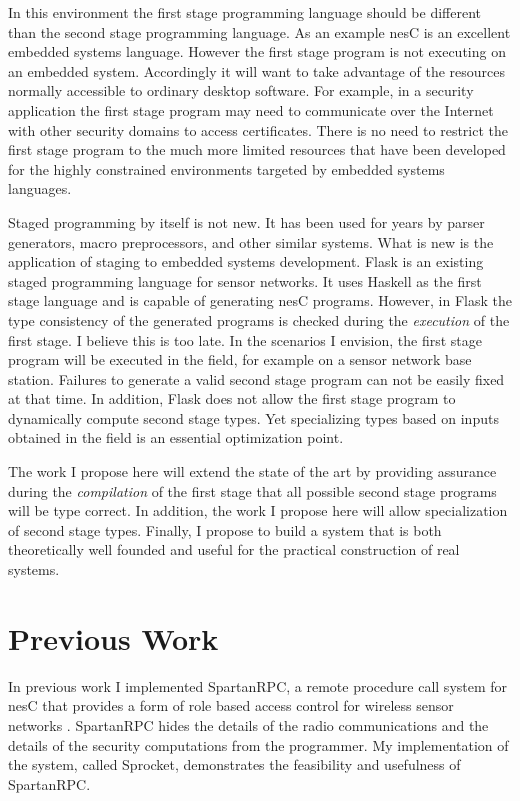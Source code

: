 \documentclass{article}
\begin{document}
In this environment the first stage programming language should be different than the second
stage programming language. As an example nesC \cite{Gay-nesC-2003} is an excellent embedded
systems language. However the first stage program is not executing on an embedded system.
Accordingly it will want to take advantage of the resources normally accessible to ordinary
desktop software. For example, in a security application the first stage program may need to
communicate over the Internet with other security domains to access certificates. There is no
need to restrict the first stage program to the much more limited resources that have been
developed for the highly constrained environments targeted by embedded systems languages.

Staged programming by itself is not new. It has been used for years by parser generators, macro
preprocessors, and other similar systems. What is new is the application of staging to embedded
systems development. Flask \cite{Mainland-Flask-2008} is an existing staged programming language
for sensor networks. It uses Haskell as the first stage language and is capable of generating
nesC programs. However, in Flask the type consistency of the generated programs is checked
during the \emph{execution} of the first stage. I believe this is too late. In the scenarios I
envision, the first stage program will be executed in the field, for example on a sensor network
base station. Failures to generate a valid second stage program can not be easily fixed at that
time. In addition, Flask does not allow the first stage program to dynamically compute second
stage types. Yet specializing types based on inputs obtained in the field is an essential
optimization point.

The work I propose here will extend the state of the art by providing assurance during the
\emph{compilation} of the first stage that all possible second stage programs will be type
correct. In addition, the work I propose here will allow specialization of second stage types.
Finally, I propose to build a system that is both theoretically well founded and useful for the
practical construction of real systems.

\section{Previous Work}
\label{sec:PreviousWork}

In previous work I implemented SpartanRPC, a remote procedure call system for nesC that provides
a form of role based access control for wireless sensor networks
\cite{chapin-skalka-SpartanRPC}. SpartanRPC hides the details of the radio communications and
the details of the security computations from the programmer. My implementation of the system,
called Sprocket, demonstrates the feasibility and usefulness of SpartanRPC.
\end{document}
